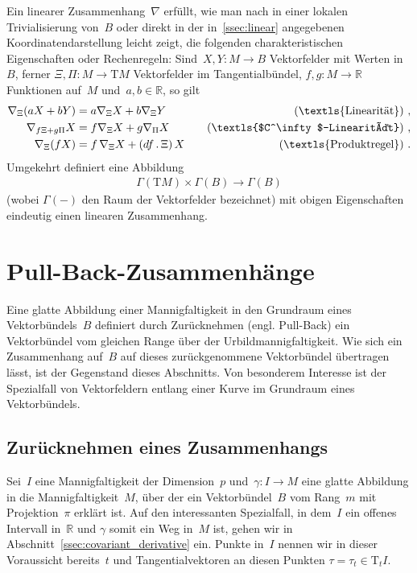 \documentclass[10pt,a4paper]{article}
\newcommand{\mydef}[1]{\textls{#1}}
\begin{document}
Ein linearer Zusammenhang~$\nabla$ erfüllt, wie man nach in einer lokalen Trivialisierung von~$B$ oder direkt in der in~\ref{ssec:linear} angegebenen Koordinaten\-darstellung leicht zeigt, die folgenden charakteristischen Eigenschaften oder Rechenregeln: Sind~$X,Y:M\rightarrow B$ Vektorfelder mit Werten in~$B$, ferner $\Xi,\Pi:M\rightarrow \mathrm{T}M$ Vektorfelder im Tangential\-bündel, $f,g:M\rightarrow \mathbb{R}$ Funktionen auf~$M$ und~$a,b\in\mathbb{R}$, so gilt
\begin{align*}
\nabla_\Xi (aX + bY)
&= a\nabla_\Xi X + b\nabla_\Xi Y
\quad&(\text{\mydef{Linearität}})
\ ,\\
\nabla_{f\Xi+g\Pi}X
&= f\nabla_\Xi X + g\nabla_\Pi X
\quad&(\text{\mydef{$C^\infty$-Linearität}})
\ ,\\
\nabla_\Xi (fX)
&= f\,\nabla_\Xi X + (df\,.\,\Xi)\,X 
\quad&(\text{\mydef{Produktregel}})
\ .
\end{align*}
Umgekehrt definiert eine Abbildung
\begin{align*}
\Gamma(\mathrm{T}M)\times\Gamma(B)\rightarrow\Gamma(B)
\end{align*}
(wobei $\Gamma(-)$ den Raum der Vektorfelder bezeichnet) mit obigen Eigenschaften  eindeutig einen linearen Zusammenhang.

\newpage

\section{Pull-Back-Zusammenhänge}

Eine glatte Abbildung einer Mannigfaltigkeit in den Grundraum eines Vektorbündels~$B$ definiert durch Zurücknehmen (engl. Pull-Back) ein Vektorbündel vom gleichen Range über der Urbild\-mannigfaltigkeit.
Wie sich ein Zusammenhang auf~$B$ auf dieses zurückgenommene Vektorbündel übertragen lässt, ist der Gegenstand dieses Abschnitts.
Von besonderem Interesse ist der Spezialfall von Vektorfeldern entlang einer Kurve im Grundraum eines Vektorbündels.

\subsection{Zurücknehmen eines Zusammenhangs}
\label{ssec:pullback}

Sei~$I$ eine Mannigfaltigkeit der Dimension~$p$ und~$\gamma: I\rightarrow M$ eine glatte Abbildung in die Mannigfaltigkeit~$M$, über der ein Vektorbündel~$B$ vom Rang~$m$ mit Projektion~$\pi$ erklärt ist.
Auf den interessanten Spezialfall, in dem~$I$ ein offenes Intervall in~$\mathbb{R}$ und $\gamma$ somit ein Weg in~$M$ ist, gehen wir in Abschnitt~\ref{ssec:covariant_derivative} ein.
Punkte in~$I$ nennen wir in dieser Voraussicht bereits~$t$ und Tangential\-vektoren an diesen Punkten $\tau=\tau_t\in\mathrm{T}_tI$.
\end{document}
